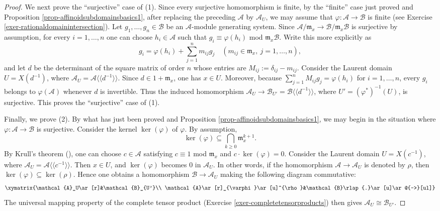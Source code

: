 \documentclass[a4paper,12pt, dvipdfmx]{jsbook}
\def\m{\mathfrak{m}}
\def\ker{\mathop{\mathrm{ker}}\nolimits}
\def\dl{\langle\!\langle}
\def\dr{\rangle\!\rangle}
\theoremstyle{plain}
\theoremstyle{definition}
\begin{document}
\begin{proof}[Proof]
We next prove the ``surjective'' case of (1).
Since every surjective homomorphism is finite, by the ``finite'' case just proved and Proposition \ref{prop-affinoidsubdomainsbasics1}, after replacing the preceding $\mathcal{A}$ by $\mathcal{A}_U$, we may assume that $\varphi\colon\mathcal{A}\rightarrow\mathcal{B}$ is finite (see Exercise \ref{exer-rationaldomainintersection}).
Let $g_1,\ldots,g_n\in\mathcal{B}$ be an $\mathcal{A}$-module generating system.
Since $\mathcal{A}/\m_x\rightarrow\mathcal{B}/\m_x\mathcal{B}$ is surjective by assumption, for every $i=1,\ldots,n$ one can choose $h_i\in\mathcal{A}$ such that $g_i\equiv\varphi(h_i)$ mod $\m_x\mathcal{B}$.
Write this more explicitly as
$$
g_i=\varphi(h_i)+\sum^n_{j=1}m_{ij}g_j\quad (m_{ij}\in\m_x,\ j=1,\ldots,n),
$$
and let $d$ be the determinant of the square matrix of order $n$ whose entries are $M_{ij}:=\delta_{ij}-m_{ij}$.
Consider the Laurent domain $U=X(d^{-1})$, where $\mathcal{A}_U=\mathcal{A}\dl d^{-1}\dr$.
Since $d\in 1+\m_x$, one has $x\in U$.
Moreover, because $\sum^n_{j=1}M_{ij}g_j=\varphi(h_i)$ for $i=1,\ldots,n$, every $g_i$ belongs to $\varphi(\mathcal{A})$ whenever $d$ is invertible.
Thus the induced homomorphism $\mathcal{A}_U\rightarrow\mathcal{B}_{U'}=\mathcal{B}\dl d^{-1}\dr$, where $U'=(\varphi^{\ast})^{-1}(U)$, is surjective.
This proves the ``surjective'' case of (1).

Finally, we prove (2).
By what has just been proved and Proposition \ref{prop-affinoidsubdomainsbasics1}, we may begin in the situation where $\varphi\colon\mathcal{A}\rightarrow\mathcal{B}$ is surjective.
Consider the kernel $\ker(\varphi)$ of $\varphi$.
By assumption,
$$
\ker(\varphi)\subseteq\bigcap_{k\geq 0}\m^{k+1}_x.
$$
By Krull's theorem (\cite[Theorem 8.9]{Matsu}), one can choose $c\in\mathcal{A}$ satisfying $c\equiv 1$ mod $\m_x$ and $c\cdot\ker(\varphi)=0$.
Consider the Laurent domain $U=X(c^{-1})$, where $\mathcal{A}_U=\mathcal{A}\dl c^{-1}\dr$.
Then $x\in U$, and $\ker(\varphi)$ becomes $0$ in $\mathcal{A}_U$.
In other words, if the homomorphism $\mathcal{A}\rightarrow\mathcal{A}_U$ is denoted by $\rho$, then $\ker(\varphi)\subseteq\ker(\rho)$.
Hence one obtains a homomorphism $\mathcal{B}\rightarrow\mathcal{A}_U$ making the following diagram commutative:
$$
\xymatrix{\mathcal{A}_U\ar[r]&\mathcal{B}_{U'}\\ \mathcal{A}\ar[r]_{\varphi}\ar[u]^{\rho}&\mathcal{B}\rlap{.}\ar[u]\ar@{-->}[ul]}
$$
The universal mapping property of the complete tensor product (Exercise \ref{exer-completetensorproducts}) then gives $\mathcal{A}_U\cong\mathcal{B}_{U'}$.
\end{proof}
\end{document}
